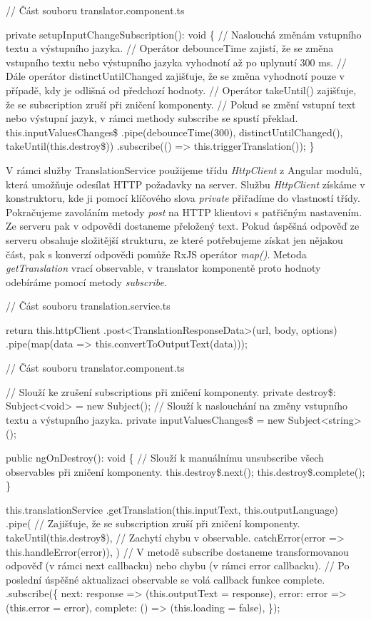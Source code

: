 \begin{prog}
// Část souboru translator.component.ts

private setupInputChangeSubscription(): void \{
  // Naslouchá změnám vstupního textu a výstupního jazyka.
  // Operátor debounceTime zajistí, že se změna vstupního textu 
    nebo výstupního jazyka vyhodnotí až po uplynutí 300 ms.
  // Dále operátor distinctUntilChanged zajišťuje, 
    že se změna vyhodnotí pouze v případě, kdy je odlišná od předchozí hodnoty.
  // Operátor takeUntil() zajišťuje, 
    že se subscription zruší při zničení komponenty.
  // Pokud se změní vstupní text nebo výstupní jazyk, 
    v rámci methody subscribe se spustí překlad.
  this.inputValuesChanges\$
    .pipe(debounceTime(300), distinctUntilChanged(), takeUntil(this.destroy\$))
    .subscribe(() => this.triggerTranslation());
\}
\end{prog}

V rámci služby TranslationService použijeme třídu \emph{HttpClient} z Angular modulů, která umožňuje odesílat HTTP požadavky na server.
Službu \emph{HttpClient} získáme v konstruktoru, kde ji pomocí klíčového slova \emph{private} přiřadíme do vlastností třídy. 
Pokračujeme zavoláním metody \emph{post} na HTTP klientovi s patřičným nastavením. Ze serveru pak v odpovědi dostaneme přeložený text. 
Pokud úspěšná odpověď ze serveru obsahuje složitější strukturu, ze které potřebujeme získat jen nějakou část, pak s konverzí odpovědi pomůže RxJS operátor \emph{map()}. 
Metoda \emph{getTranslation} vrací observable, v translator komponentě proto hodnoty odebíráme pomocí metody \emph{subscribe}.

\begin{prog}
// Část souboru translation.service.ts

return this.httpClient
  .post<TranslationResponseData>(url, body, options)
  .pipe(map(data => this.convertToOutputText(data)));

// Část souboru translator.component.ts

// Slouží ke zrušení subscriptions při zničení komponenty.
private destroy\$: Subject<void> = new Subject();
// Slouží k naslouchání na změny vstupního textu a výstupního jazyka.
private inputValuesChanges\$ = new Subject<string>();

public ngOnDestroy(): void \{
  // Slouží k manuálnímu unsubscribe všech observables při zničení komponenty.
  this.destroy\$.next();
  this.destroy\$.complete();
\}

this.translationService
  .getTranslation(this.inputText, this.outputLanguage)
  .pipe(
    // Zajišťuje, že se subscription zruší při zničení komponenty.
    takeUntil(this.destroy\$),
    // Zachytí chybu v observable.
    catchError(error => this.handleError(error)),
  )
  // V metodě subscribe dostaneme transformovanou odpověď 
    (v rámci next callbacku) nebo chybu (v rámci error callbacku).
  // Po poslední úspěšné aktualizaci observable se volá callback funkce complete.
  .subscribe(\{
    next: response => (this.outputText = response),
    error: error => (this.error = error),
    complete: () => (this.loading = false),
  \});
\end{prog}

